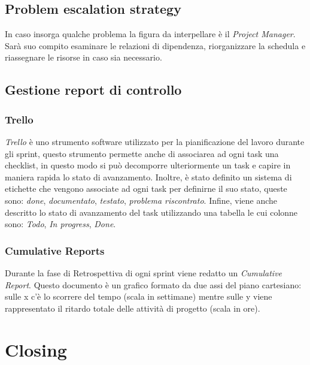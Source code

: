 \documentclass{article}
\begin{document}
  \subsection{Problem escalation strategy}

 In caso insorga qualche problema la figura da interpellare è il \emph{Project Manager}. 
    Sarà suo compito esaminare le relazioni di dipendenza, riorganizzare la schedula e riassegnare le risorse in caso sia necessario.

  \subsection{Gestione report di controllo}

  \subsubsection*{Trello}
  \emph{Trello} è uno strumento software utilizzato per la pianificazione del lavoro durante gli sprint, questo strumento permette
    anche di associarea ad ogni task una checklist, in questo modo si può decomporre ulteriormente un task e capire in maniera rapida
    lo stato di avanzamento. Inoltre, è stato definito un sistema di etichette che vengono associate ad ogni task per definirne il suo stato,
    queste sono: \emph{done}, \emph{documentato}, \emph{testato}, \emph{problema riscontrato}.
    Infine, viene anche descritto lo stato di avanzamento del task utilizzando una tabella le cui colonne sono: 
    \emph{Todo}, \emph{In progress}, \emph{Done}.


  \subsubsection*{Cumulative Reports}
  Durante la fase di Retrospettiva di ogni sprint viene redatto un \emph{Cumulative Report}.
    Questo documento è un grafico formato da due assi del piano cartesiano: sulle x c’è lo scorrere del tempo
    (scala in settimane) mentre sulle y viene rappresentato il ritardo totale delle attività di progetto (scala in ore).


  \newpage
  \section{Closing}
\end{document}

